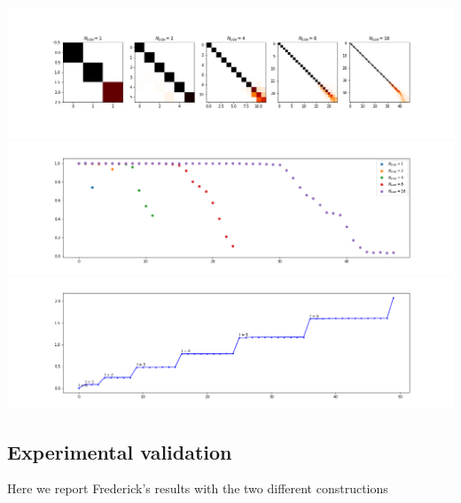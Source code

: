 \begin{minipage}{.5\textwidth}
	\centering
	\includegraphics[width=0.9\linewidth]{../codes/02.HeatKernelGraphLaplacian/HEALPix/06_figures/optimal_thresholded.png}
	\includegraphics[width=0.9\linewidth]{../codes/02.HeatKernelGraphLaplacian/HEALPix/06_figures/optimal_thresholded_diagonal.png}
	\includegraphics[width=0.9\linewidth]{../codes/02.HeatKernelGraphLaplacian/HEALPix/06_figures/optimal_thresholded_eigenvalues.png}
	
\end{minipage}


\clearpage
\subsection{Experimental validation}
\label{sec:Experimental validation}
Here we report Frederick's results with the two different constructions
